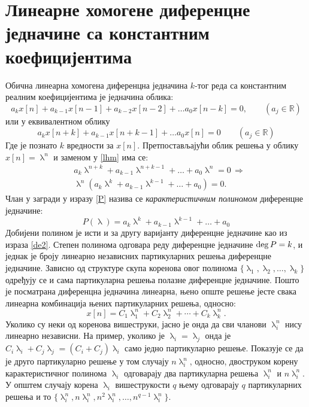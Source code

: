 \section{Линеарне хомогене диференцне једначине са
константним коефицијентима}

Обична линеарна хомогена диференцна једначина $k$-тог 
реда са константним реалним коефицијентима је једначина облика: 
\begin{equation}
 a_k x[n] + a_{k-1} x[n-1] + a_{k-2} x[n-2] + 
 \ldots a_0 x[n-k] = 0, \qquad (a_j \in \mathbb R)
 \label{de2}
\end{equation}
или у еквивалентном облику 
\begin{equation}
 a_k x[n+k] + a_{k-1} x[n+k-1] + \ldots a_0 x[n] = 0
 \qquad (a_j \in \mathbb R)
 \label{lhm}
\end{equation}
Где је  познато $k$ вредности за $x[n]$. 
Претпостављајући облик решења у облику
$x[n] = \uplambda^n$ и заменом у 
\eqref{lhm} има се: 
\begin{eqnarray}
& a_k \uplambda^{n+k} + 
a_{k-1} \uplambda^{n+k-1} + 
\ldots
+ a_0 \uplambda^n = 0 \, \Rightarrow \\ 
&
\uplambda^n(
a_k \uplambda^{k} + 
a_{k-1} \uplambda^{k-1} + 
\ldots
+ a_0) = 0. \label{P}
\end{eqnarray}
Члан у загради у изразу \eqref{P} назива се 
\textit{карактеристичним полиномом} диференцне једначине:
\begin{equation}
P(\uplambda) =
a_k \uplambda^{k} + 
a_{k-1} \uplambda^{k-1} + 
\ldots
+ a_0
\end{equation}
Добијени полином је исти и за другу варијанту 
диференцне једначине као из израза \eqref{de2}.
Степен полинома одговара реду диференцне једначине 
${\rm deg}\,P = k$, и једнак је броју линеарно независних
партикуларних решења диференцне једначине. 
Зависно од структуре скупа коренова овог полинома
$\{\uplambda_1, \uplambda_2, \ldots, \uplambda_k\}$ 
одређују се и сама партикуларна решења полазне 
диференцне једначине. Пошто је посматрана диференцна
једначина линеарна, њено опште решење јесте 
свака линеарна комбинација њених партикуларних
решења, односно:
\begin{equation}
x[n] = C_1 \uplambda_1^n + C_2 \uplambda_2^n + \cdots
+ C_k \uplambda_k^n.
\end{equation}
Уколико су неки од коренова вишеструки, јасно је онда
да сви чланови $\uplambda_i^n$ нису линеарно независни. На пример, 
уколико је $\uplambda_i = \uplambda_j$ онда је  
$C_i \uplambda_i + C_j \uplambda_j = (C_i + C_j) 
\uplambda_i$ само једно партикуларно решење. Показује
се да је друго партикуларно решење у том случају 
$n\uplambda_i^n$, односно, двоструком корену 
карактеристичног полинома $\uplambda_i$ одговарају
два партикуларна решења $\uplambda_i^n$ и 
$n\uplambda_i^n$. У општем случају корена $\uplambda_i$ вишеструкости $q$ њему одговарају $q$ партикуларних
решења и то $\{\uplambda_i^n, n\uplambda_i^n, 
n^2\uplambda_i^n, \ldots, n^{q-1}\uplambda_i^n\}$. 

